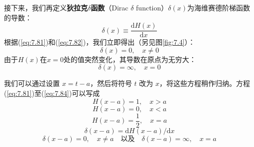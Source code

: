     接下来，我们再定义\textbf{狄拉克$\delta$函数}（Dirac $\delta$ function）$\delta\left(x\right)$为海维赛德阶梯函数的导数：
    \begin{equation}
        \delta\left(x\right) \equiv \frac{\mathrm{d}H\left(x\right)}{\mathrm{d}x}
        \label{eq:7.82}
    \end{equation}
    根据(\ref{eq:7.81})和(\ref{eq:7.82})，我们立即得出（另见图\ref{fig:7.4}）：
    \begin{equation}
        \delta\left(x\right) = 0, \quad x \neq 0
        \label{eq:7.83}
    \end{equation}
    由于$H\left(x\right)$在$x=0$处的值突然变化，其导数在原点为无穷大：
    \begin{equation}
        \delta\left(x\right) = \infty, \quad x = 0
        \label{eq:7.84}
    \end{equation}

    我们可以通过设置 $x = t-a$，然后将符号 $t$ 改为 $x$，将这些方程稍作归纳。方程(\ref{eq:7.81})至(\ref{eq:7.84})可以写成
    \begin{equation}
        H\left(x-a\right) = 1, \quad x > a
        \label{eq:7.85}
    \end{equation}
    \begin{equation}
        H\left(x-a\right) = 0, \quad x < a
        \label{eq:7.86}
    \end{equation}
    \begin{equation}
        H\left(x-a\right) = \frac{1}{2}, \quad x = a
        \label{eq:7.87}
    \end{equation}
    \begin{equation}
        \delta\left(x-a\right) = \mathrm{d}H\left(x-a\right)/\mathrm{d}x
        \label{eq:7.88}
    \end{equation}
    \begin{equation}
        \delta\left(x-a\right) = 0, \quad x \neq a \quad \text{以及} \quad \delta\left(x-a\right) = \infty, \quad x = a
        \label{eq:7.89}
    \end{equation}


